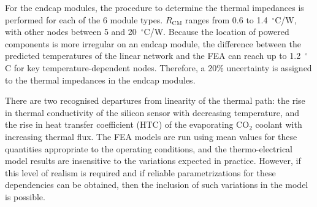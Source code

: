 For the endcap modules, the procedure to determine the thermal impedances is performed for
each of the 6 module types. $R_\text{CM}$ ranges from 0.6 to 1.4~$^\circ$C/W, with other nodes
between 5 and 20~$^\circ$C/W. Because the location of powered components is more irregular on an
endcap module, the difference between the predicted temperatures of the linear network and the FEA
can reach up to 1.2~$^\circ$C for key temperature-dependent nodes. Therefore, a 20\% uncertainty is assigned
to the thermal impedances in the endcap modules.

There are two recognised departures from linearity of the thermal path: the rise in thermal conductivity of the silicon sensor with decreasing temperature, and the rise in heat transfer coefficient (HTC) of the evaporating CO$_2$ coolant with increasing thermal flux. The FEA models are run using mean values for these quantities appropriate to the operating conditions, and the thermo-electrical model results are insensitive to the variations expected in practice. However, if this level of realism is required and if reliable parametrizations for these dependencies can be obtained, then the inclusion of such variations in the model is possible.
